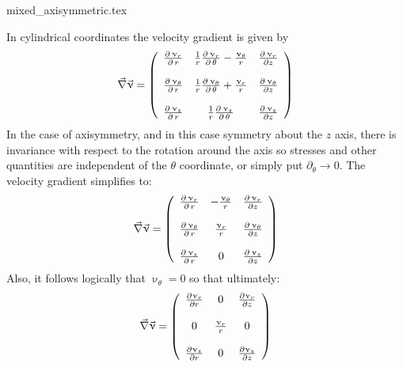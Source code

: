 \begin{flushright} {\tiny {\color{gray} mixed\_axisymmetric.tex}} \end{flushright}



In cylindrical coordinates the velocity gradient is given by 
\begin{equation}
\vec\nabla \vec{\upnu}  =
\left(
\begin{array}{ccc}
{\partial \, \upnu_r \over \partial \, r} &
{1 \over r} {\partial \, \upnu_r \over \partial \, \theta} - {\upnu_{\theta} \over r} &
{\partial \, \upnu_r \over \partial z} \\
\\
{\partial \, \upnu_{\theta} \over \partial \, r} &
{1 \over r} {\partial \, \upnu_{\theta} \over \partial \, \theta} + 
{\upnu_r \over r} &
{\partial \, \upnu_{\theta} \over \partial z} \\
\\
{\partial \, \upnu_{z} \over \partial \, r} &
{1 \over r} {\partial \, \upnu_{z} \over \partial \, \theta} &
{\partial \, \upnu_{z} \over \partial z}
\end{array}
\right)
\end{equation}
In the case of axisymmetry, and in this case symmetry about the $z$ axis, there is invariance with respect to the rotation around the axis so stresses and other quantities are independent of the $\theta$ coordinate, or simply put $\partial_\theta \rightarrow 0$.
The velocity gradient simplifies to:
\begin{equation}
\vec\nabla \vec{\upnu}  =
\left(
\begin{array}{ccc}
{\partial \, \upnu_r \over \partial \, r} &
- {\upnu_{\theta} \over r} &
{\partial \, \upnu_r \over \partial z} \\
\\
{\partial \, \upnu_{\theta} \over \partial \, r} &
{\upnu_r \over r} &
{\partial \, \upnu_{\theta} \over \partial z} \\
\\
{\partial \, \upnu_{z} \over \partial \, r} &
0 &
{\partial \, \upnu_{z} \over \partial z}
\end{array}
\right)
\end{equation}
Also, it follows logically that $\upnu_\theta=0$ so that ultimately:
\begin{equation}
\vec\nabla \vec{\upnu}  =
\left(
\begin{array}{ccc}
\frac{\partial \upnu_r}{\partial r} & 0 & {\partial \upnu_r \over \partial z} \\\\
0 & {\upnu_r \over r} & 0 \\ \\
{\partial \upnu_{z} \over \partial  r} & 0 & {\partial  \upnu_{z} \over \partial z}
\end{array}
\right)
\end{equation}
